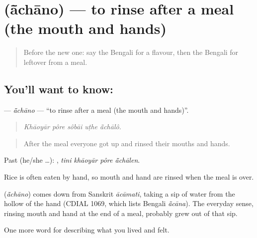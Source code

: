 \section[\texorpdfstring{\bn{আঁচানো} (ā̃chāno)}{আঁচানো (ā̃chāno)}]{ (ā̃chāno) — to rinse after a meal (the mouth and hands)}

\label{lesson:BN-C515-achano}



\begin{quote}
Before the new one: say the Bengali for a flavour, then the Bengali for leftover from a meal.
\end{quote}

\subsection*{You'll want to know: }
\textbf{} — \emph{ā̃chāno} — \textquotedblleft{}to rinse after a meal (the mouth and hands)\textquotedblright{}.

\begin{quote}
    
\end{quote}

\begin{quote}
\emph{Khāoyār pôre sôbāi uṭhe ā̃chālô.}
\end{quote}

\begin{quote}
After the meal everyone got up and rinsed their mouths and hands.
\end{quote}

Past (he/she …):    , \emph{tini khāoyār pôre ā̃chālen}.

Rice is often eaten by hand, so mouth and hand are rinsed when the meal is over.

\begin{cousinweb}
\textbf{} (\emph{ā̃chāno}) comes down from Sanskrit \emph{ācāmati}, taking a sip of water from the hollow of the hand (CDIAL 1069, which lists Bengali \emph{ā̃cāna}). The everyday sense, rinsing mouth and hand at the end of a meal, probably grew out of that sip.
\end{cousinweb}

\begin{grammarlens}[title={What you've built}]
One more word for describing what you lived and felt.
\end{grammarlens}

